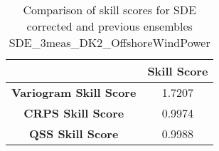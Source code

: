 
        \begin{table}[h!]
            \centering
            \begin{tabular}{|c|c|}
                \hline
                & \textbf{Skill Score}  \\
                \hline
                \textbf{Variogram Skill Score} & 1.7207  \\
                \hline
                \textbf{CRPS Skill Score} & 0.9974  \\
                \hline
                \textbf{QSS Skill Score} & 0.9988 \\
                \hline
            \end{tabular}
            \caption{Comparison of skill scores for SDE corrected and previous ensembles SDE_3meas_DK2_OffshoreWindPower}
            \label{table:skill_scores_comparison}
        \end{table}
        